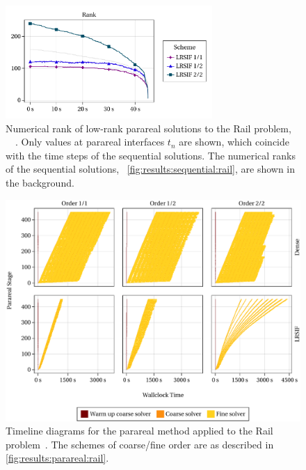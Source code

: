 \begin{figure}[tp]
  \centering
  \includegraphics[width=0.7\textwidth]{figures/fig_results_parareal_rank.pdf}
  \caption[Numerical rank of low-rank parareal solutions to Rail problem]{%
    Numerical rank of low-rank parareal solutions to the Rail problem,
    \cf~\citeauthor{Lang2017}~\cite[Figure~6.6b]{Lang2017}.
    Only values at parareal interfaces $t_n$ are shown,
    which coincide with the time steps of the sequential solutions.
    The numerical ranks of the sequential solutions,
    \cf~\autoref{fig:results:sequential:rail},
    are shown in the background.
  }
  \label{fig:results:parareal:rank}
\end{figure}

\begin{figure}[tp]
  \includegraphics[width=\textwidth]{figures/fig_timeline_all.pdf}
  \caption[Timeline diagrams for parareal method applied to Rail problem]{%
    Timeline diagrams for the parareal method applied to the Rail problem~\cite{morwiki_steel}.
    The schemes of coarse/fine order are as described in \autoref{fig:results:parareal:rail}.
  }
  \label{fig:results:parareal:timeline}
\end{figure}

